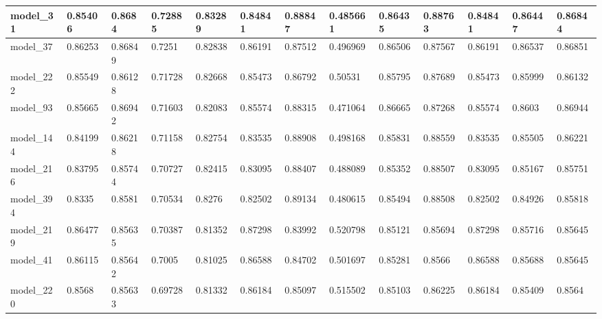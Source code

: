 \begin{tabular}{|l|l|l|l|l|l|l|l|l|l|l|l|l|}
model\_31      & 0.85406     & 0.8684         & 0.72885      & 0.83289          & 0.84841              & 0.88847              & 0.485661     & 0.86435           & 0.88763            & 0.84841         & 0.86447     & 0.86844      \\ \hline
model\_37      & 0.86253     & 0.86849        & 0.7251       & 0.82838          & 0.86191              & 0.87512              & 0.496969     & 0.86506           & 0.87567            & 0.86191         & 0.86537     & 0.86851      \\ \hline
model\_222     & 0.85549     & 0.86128        & 0.71728      & 0.82668          & 0.85473              & 0.86792              & 0.50531      & 0.85795           & 0.87689            & 0.85473         & 0.85999     & 0.86132      \\ \hline
model\_93      & 0.85665     & 0.86942        & 0.71603      & 0.82083          & 0.85574              & 0.88315              & 0.471064     & 0.86665           & 0.87268            & 0.85574         & 0.8603      & 0.86944      \\ \hline
model\_144     & 0.84199     & 0.86218        & 0.71158      & 0.82754          & 0.83535              & 0.88908              & 0.498168     & 0.85831           & 0.88559            & 0.83535         & 0.85505     & 0.86221      \\ \hline
model\_216     & 0.83795     & 0.85744        & 0.70727      & 0.82415          & 0.83095              & 0.88407              & 0.488089     & 0.85352           & 0.88507            & 0.83095         & 0.85167     & 0.85751      \\ \hline
model\_394     & 0.8335      & 0.8581         & 0.70534      & 0.8276           & 0.82502              & 0.89134              & 0.480615     & 0.85494           & 0.88508            & 0.82502         & 0.84926     & 0.85818      \\ \hline
model\_219     & 0.86477     & 0.85635        & 0.70387      & 0.81352          & 0.87298              & 0.83992              & 0.520798     & 0.85121           & 0.85694            & 0.87298         & 0.85716     & 0.85645      \\ \hline
model\_41      & 0.86115     & 0.85642        & 0.7005       & 0.81025          & 0.86588              & 0.84702              & 0.501697     & 0.85281           & 0.8566             & 0.86588         & 0.85688     & 0.85645      \\ \hline
model\_220     & 0.8568      & 0.85633        & 0.69728      & 0.81332          & 0.86184              & 0.85097              & 0.515502     & 0.85103           & 0.86225            & 0.86184         & 0.85409     & 0.8564       \\ \hline

\end{tabular}
